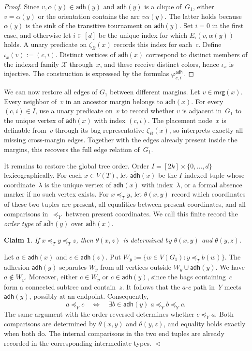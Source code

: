\documentclass[1p,number,11pt]{elsarticle}
\theoremstyle{plain}
\newtheorem{claim}{Claim}
\newenvironment{claimproof}{ \trivlist
	\item[\hskip\labelsep
	\emph{Proof of the claim}.]\ignorespaces
}{\hfill$\vartriangleleft$\vspace{10pt}\par}
\newcommand{\mrg}{\mathsf{mrg}}
\newcommand{\adh}{\mathsf{adh}}
\begin{document}
\begin{proof}
Since $v,\alpha(y)\in\adh(y)$ and $\adh(y)$ is a clique of~$G_1$, either
$v=\alpha(y)$ or the orientation contains the arc $v\alpha(y)$. The latter
holds because $\alpha(y)$ is the sink of the transitive tournament on
$\adh(y)$.  Set $i=0$ in the first case, and otherwise let $i\in[d]$ be the
unique index for which $E_i(v,\alpha(y))$ holds.  A unary predicate on
$\zeta_B(x)$ records this index for each~$c$.  Define
$\iota_x(v):=(c,i)$.  Distinct vertices of $\adh(x)$ correspond to distinct
members of the indexed family $\mathscr X$ through~$x$, and these receive
distinct colors, hence $\iota_x$ is injective.  The construction is expressed
by the formulas $\varphi^{\adh}_{c,i}$.
\end{proof}

We can now restore all edges of $G_1$ between different margins.  Let
$v\in\mrg(x)$.  Every neighbor of~$v$ in an ancestor margin belongs to
$\adh(x)$.  For every $(c,i)\in I$, use a unary predicate on~$v$ to record
whether $v$ is adjacent in~$G_1$ to the unique vertex of $\adh(x)$ with index
$(c,i)$.  The placement node~$x$ is definable from~$v$ through its bag
representative $\zeta_B(x)$, so  interprets exactly all
missing cross-margin edges.  Together with the edges already present inside
the margins, this recovers the full edge relation of~$G_1$.

It remains to restore the global tree order.
Order $I=[2k]\times\{0,\ldots,d\}$ lexicographically.
For each $x\in V(T)$, let $\overline{\adh}(x)$ be the $I$-indexed tuple whose coordinate~$\lambda$ is the unique vertex of $\adh(x)$ with index~$\lambda$, or a formal absence marker if no such vertex exists.
For $x\preceq_Ty$, let $\theta(x,y)$ record which coordinates of these two tuples are present, all equalities between present coordinates, and all comparisons in~$\preceq_Y$ between present coordinates.
We call this finite record the \emph{order type} of $\overline{\adh}(y)$ over $\overline{\adh}(x)$. 

\begin{claim}
If $x\preceq_T y\preceq_T z$, then $\theta(x,z)$ is determined by
$\theta(x,y)$ and $\theta(y,z)$.
\end{claim}
\begin{claimproof}
Let $a\in\adh(x)$ and $c\in\adh(z)$.  Put $W_y:=\{w\in V(G_1):y\preceq_Tb(w)\}$.
The adhesion $\adh(y)$ separates $W_y$ from all vertices outside $W_y\cup\adh(y)$.
We have $a\notin W_y$.
Moreover, either $c\in W_y$ or $c\in\adh(y)$, since the bags containing~$c$ form a connected subtree and contain~$z$.
It follows that the $a$-$c$ path in~$Y$ meets $\adh(y)$, possibly at an endpoint.
Consequently,
\[
 a\preceq_Yc\quad\Longleftrightarrow\quad
 \exists b\in\adh(y)\;a\preceq_Yb\preceq_Yc.
\]
The same argument with the order reversed determines whether $c\preceq_Ya$.
Both comparisons are determined by $\theta(x,y)$ and $\theta(y,z)$, and equality holds exactly when both do.
The internal comparisons in the two end tuples are already recorded in the corresponding intermediate types.
\end{claimproof}
\end{document}
